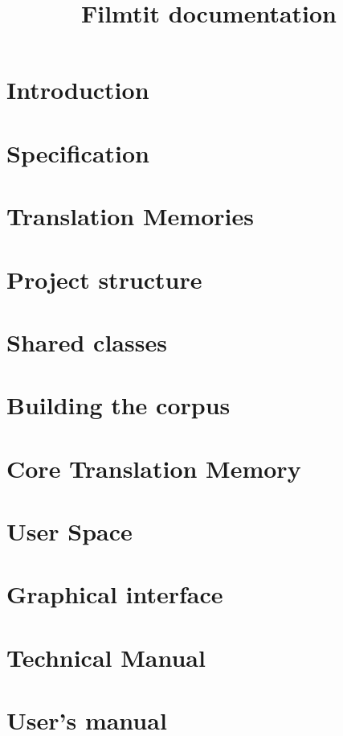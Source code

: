 \documentclass[11pt, oneside]{book}
\title{Filmtit documentation}
\author{}
\begin{document}



\tableofcontents*
\sloppy

\newpage

\setcounter{page}{1}


\chapter{Introduction}


\chapter{Specification}


\chapter{Translation Memories}


\chapter{Project structure}


\chapter{Shared classes}


\chapter{Building the corpus}



\chapter{Core Translation Memory}


\chapter{User Space}


\chapter{Graphical interface}


\chapter{Technical Manual}


\chapter{User's manual}

\end{document}
